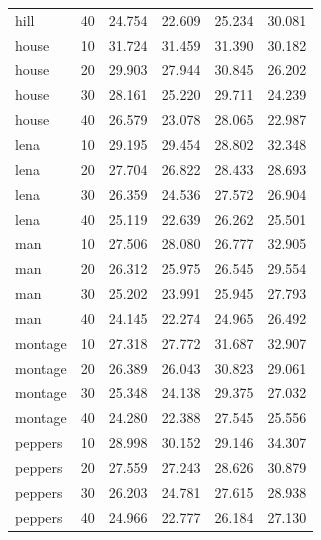\begin{tabular}{lrrrrr}
hill&40&24.754&22.609&25.234&30.081\\
house&10&31.724&31.459&31.390&30.182\\
house&20&29.903&27.944&30.845&26.202\\
house&30&28.161&25.220&29.711&24.239\\
house&40&26.579&23.078&28.065&22.987\\
lena&10&29.195&29.454&28.802&32.348\\
lena&20&27.704&26.822&28.433&28.693\\
lena&30&26.359&24.536&27.572&26.904\\
lena&40&25.119&22.639&26.262&25.501\\
man&10&27.506&28.080&26.777&32.905\\
man&20&26.312&25.975&26.545&29.554\\
man&30&25.202&23.991&25.945&27.793\\
man&40&24.145&22.274&24.965&26.492\\
montage&10&27.318&27.772&31.687&32.907\\
montage&20&26.389&26.043&30.823&29.061\\
montage&30&25.348&24.138&29.375&27.032\\
montage&40&24.280&22.388&27.545&25.556\\
peppers&10&28.998&30.152&29.146&34.307\\
peppers&20&27.559&27.243&28.626&30.879\\
peppers&30&26.203&24.781&27.615&28.938\\
peppers&40&24.966&22.777&26.184&27.130\\
\bottomrule
\end{tabular}

